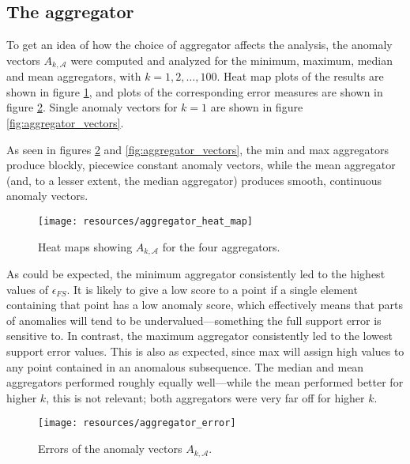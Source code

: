 \clearpage

\subsection{The aggregator}
\FloatBarrier
\label{sect:A}

To get an idea of how the choice of aggregator affects the analysis, the anomaly vectors $A_{k, \mathcal{A}}$ were computed and analyzed for the minimum, maximum, median and mean aggregators, with $k = 1,2,\dots,100$. Heat map plots of the results are shown in figure \ref{fig:aggregator_heat_map}, and plots of the corresponding error measures are shown in figure \ref{fig:aggregator_error}. Single anomaly vectors for $k=1$ are shown in figure \ref{fig:aggregator_vectors}.

As seen in figures \ref{fig:aggregator_error} and \ref{fig:aggregator_vectors}, the min and max aggregators produce blockly, piecewice constant anomaly vectors, while the mean aggregator (and, to a lesser extent, the median aggregator) produces smooth, continuous anomaly vectors.

\begin{figure}[!ht]
    \vspace{-20pt}
    \begin{center}
        \texttt{[image: resources/aggregator\_heat\_map]}
    \end{center}
    \vspace{-10pt}
    \caption{\small{Heat maps showing $A_{k, \mathcal{A}}$ for the four aggregators.}}
    \label{fig:aggregator_heat_map}
    \vspace{-15pt}
\end{figure}

As could be expected, the minimum aggregator consistently led to the highest values of $\epsilon_{FS}$. It is likely to give a low score to a point if a single element containing that point has a low anomaly score, which effectively means that parts of anomalies will tend to be undervalued---something the full support error is sensitive to. In contrast, the maximum aggregator consistently led to the lowest support error values. This is also as expected, since max will assign high values to any point contained in an anomalous subsequence. The median and mean aggregators performed roughly equally well---while the mean performed better for higher $k$, this is not relevant; both aggregators were very far off for higher $k$.

\begin{figure}[!ht]
    \vspace{-15pt}
    \begin{center}
        \texttt{[image: resources/aggregator\_error]}
    \end{center}
    \vspace{-18pt}
    \caption{\small{Errors of the anomaly vectors $A_{k, \mathcal{A}}$.}}
    \label{fig:aggregator_error}
    \vspace{-10pt}
\end{figure}

